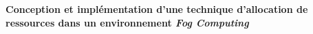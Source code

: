 \newpage
\AddToShipoutPicture*{\BackgroundPic}
\AddToShipoutPicture*{\EtiquetteThese}

\thispagestyle{empty}

\begin{center}
	\Huge \color[RGB]{18,96,149} \bfseries{Conception et implémentation d'une technique d'allocation de ressources dans un environnement \emph{Fog Computing}}\\
\end{center}
\vspace{1.5 cm}


%